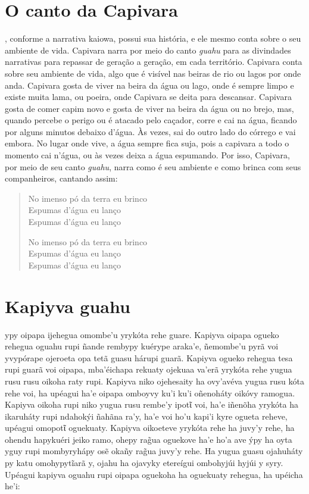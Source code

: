 \chapter{O canto da Capivara}

, conforme a narrativa kaiowa, possui sua história, e ele mesmo
conta sobre o seu ambiente de vida. Capivara narra por meio do canto
\textit{guahu} para as divindades narrativas para repassar de geração a
geração, em cada território. Capivara conta sobre seu ambiente de vida,
algo que é visível nas beiras de rio ou lagos por onde anda. Capivara
gosta de viver na beira da água ou lago, onde é sempre limpo e existe
muita lama, ou poeira, onde Capivara se deita para descansar. Capivara
gosta de comer capim novo e gosta de viver na beira da água ou no brejo,
mas, quando percebe o perigo ou é atacado pelo caçador, corre e cai na
água, ficando por alguns minutos debaixo d'água. Às vezes, sai do outro
lado do córrego e vai embora. No lugar onde vive, a água sempre fica
suja, pois a capivara a todo o momento cai n'água, ou às vezes deixa a
água espumando. Por isso, Capivara, por meio de seu canto \textit{guahu},
narra como é seu ambiente e como brinca com seus companheiros, cantando
assim:

\begin{verse}
No imenso pó da terra eu brinco\\
Espumas d'água eu lanço\\
Espumas d'água eu lanço

No imenso pó da terra eu brinco\\
Espumas d'água eu lanço\\
Espumas d'água eu lanço
\end{verse}

\chapter{Kapiyva guahu}

 ypy oipapa ijehegua omombe'u yrykóta rehe guare. Kapiyva oipapa
ogueko rehegua oguahu rupi ñande rembypy kuérype araka'e, ñemombe'u pyrã
voi yvypórape ojeroeta opa tetã guasu hárupi guarã. Kapiyva ogueko
rehegua tesa rupi guarã voi oipapa, mba'éichapa rekuaty ojekuaa va'erã
yrykóta rehe yugua rusu rusu oikoha raty rupi. Kapiyva niko ojehesaity
ha ovy'avéva yugua rusu kóta rehe voi, ha upéagui ha'e oipapa omboyvy
ku'i ku'i oñenoháty oikóvy ramogua. Kapiyva oikoha rupi niko yugua rusu
rembe'y ipotῖ voi, ha'e iñenõha yrykóta ha ikaruháty rupi ndahokýi
ñahãna ra'y, ha'e voi ho'u kapi'i kyre ogueta reheve, upéagui omopotῖ
oguekuaty. Kapiyva oikoeteve yrykóta rehe ha juvy'y rehe, ha ohendu
hapykuéri jeiko ramo, ohepy rag̃ua oguekove ha'e ho'a ave ýpy ha oyta
yguy rupi mombyryhápy osẽ okañy rag̃ua juvy'y rehe. Ha yugua guasu
ojahuháty py katu omohypytĩarã y, ojahu ha ojavyky etereígui ombohyjúi
hyjúi y syry. Upéagui kapiyva oguahu rupi oipapa oguekoha ha oguekuaty
rehegua, ha upéicha he'i:

